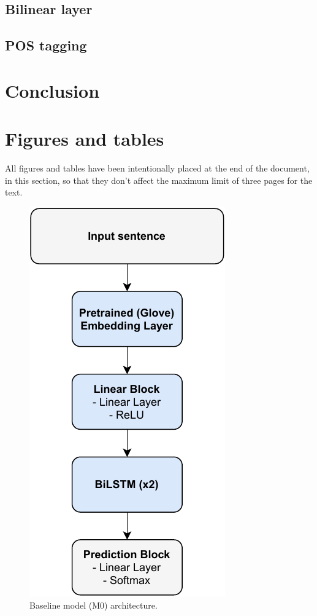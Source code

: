 \documentclass[11pt,a4paper]{article}
\begin{document}
	\subsection{Bilinear layer}
	
	\subsection{POS tagging}
	
	\section{Conclusion}
	
	
	
	
	\clearpage
	\section{Figures and tables}
	All figures and tables have been intentionally placed at the end of the document, in this section, so that they don't affect the maximum limit of three pages for the text.
	
	\begin{figure}[h]
		\centering
		\includegraphics[width=0.7\columnwidth]{M0_diagram.pdf}
		\caption{Baseline model (M0) architecture.}
		\label{fig:M0_architecture}
	\end{figure}
	
\end{document}
